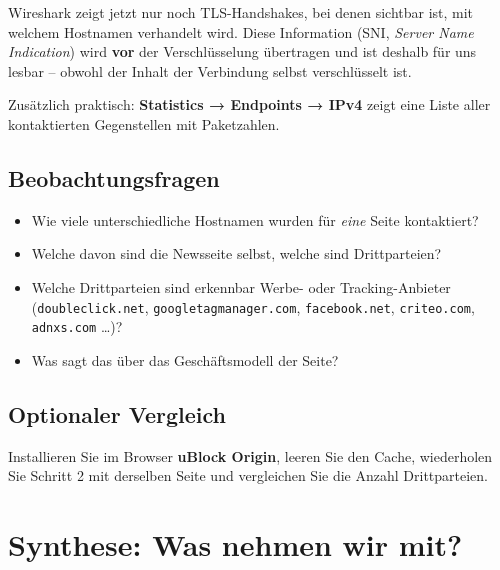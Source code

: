 \documentclass[
  nswissgerman,
  a4paper,
  DIV=11,
  numbers=noendperiod,
  ngerman]{scrreprt}
\providecommand{\tightlist}{%
  \setlength{\itemsep}{0pt}\setlength{\parskip}{0pt}}
\begin{document}
Wireshark zeigt jetzt nur noch TLS-Handshakes, bei denen sichtbar ist,
mit welchem Hostnamen verhandelt wird. Diese Information (SNI,
\emph{Server Name Indication}) wird \textbf{vor} der Verschlüsselung
übertragen und ist deshalb für uns lesbar -- obwohl der Inhalt der
Verbindung selbst verschlüsselt ist.

Zusätzlich praktisch: \textbf{Statistics → Endpoints → IPv4} zeigt eine
Liste aller kontaktierten Gegenstellen mit Paketzahlen.

\subsection{Beobachtungsfragen}\label{beobachtungsfragen-4}

\begin{itemize}
\tightlist
\item
  Wie viele unterschiedliche Hostnamen wurden für \emph{eine} Seite
  kontaktiert?
\item
  Welche davon sind die Newsseite selbst, welche sind Drittparteien?
\item
  Welche Drittparteien sind erkennbar Werbe- oder Tracking-Anbieter
  (\texttt{doubleclick.net}, \texttt{googletagmanager.com},
  \texttt{facebook.net}, \texttt{criteo.com}, \texttt{adnxs.com}
  \ldots)?
\item
  Was sagt das über das Geschäftsmodell der Seite?
\end{itemize}

\subsection{Optionaler Vergleich}\label{optionaler-vergleich}

Installieren Sie im Browser \textbf{uBlock Origin}, leeren Sie den
Cache, wiederholen Sie Schritt 2 mit derselben Seite und vergleichen Sie
die Anzahl Drittparteien.

\section{Synthese: Was nehmen wir
mit?}\label{synthese-was-nehmen-wir-mit}
\end{document}
